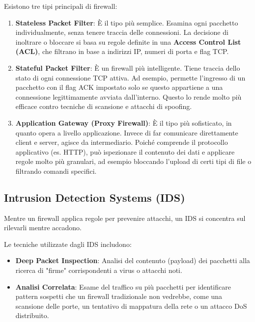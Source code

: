 Esistono tre tipi principali di firewall:
\begin{enumerate}
    \item \textbf{Stateless Packet Filter}: È il tipo più semplice. Esamina ogni pacchetto individualmente, senza tenere traccia delle connessioni. La decisione di inoltrare o bloccare si basa su regole definite in una \textbf{Access Control List (ACL)}, che filtrano in base a indirizzi IP, numeri di porta e flag TCP.
    \item \textbf{Stateful Packet Filter}: È un firewall più intelligente. Tiene traccia dello stato di ogni connessione TCP attiva. Ad esempio, permette l'ingresso di un pacchetto con il flag ACK impostato solo se questo appartiene a una connessione legittimamente avviata dall'interno. Questo lo rende molto più efficace contro tecniche di scansione e attacchi di spoofing.
    \item \textbf{Application Gateway (Proxy Firewall)}: È il tipo più sofisticato, in quanto opera a livello applicazione. Invece di far comunicare direttamente client e server, agisce da intermediario. Poiché comprende il protocollo applicativo (es. HTTP), può ispezionare il contenuto dei dati e applicare regole molto più granulari, ad esempio bloccando l'upload di certi tipi di file o filtrando comandi specifici.
\end{enumerate}

\subsection{Intrusion Detection Systems (IDS)}
Mentre un firewall applica regole per prevenire attacchi, un IDS si concentra sul rilevarli mentre accadono.


Le tecniche utilizzate dagli IDS includono:
\begin{itemize}
    \item \textbf{Deep Packet Inspection}: Analisi del contenuto (payload) dei pacchetti alla ricerca di "firme" corrispondenti a virus o attacchi noti.
    \item \textbf{Analisi Correlata}: Esame del traffico su più pacchetti per identificare pattern sospetti che un firewall tradizionale non vedrebbe, come una scansione delle porte, un tentativo di mappatura della rete o un attacco DoS distribuito.
\end{itemize}

